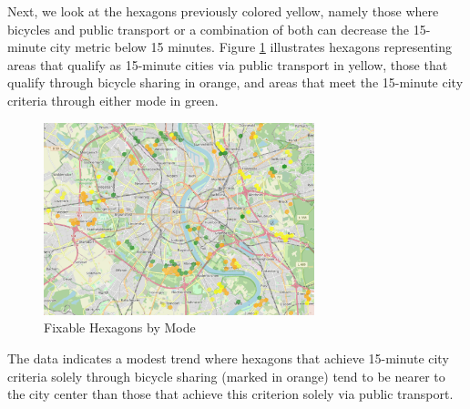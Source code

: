 Next, we look at the hexagons previously colored yellow, namely those where bicycles and public transport or a combination of both can decrease the 15-minute city metric below 15 minutes.
Figure \ref{fig:fixable_hexagons} illustrates hexagons representing areas that qualify as 15-minute cities via public transport in yellow, those that qualify through bicycle sharing in orange, and areas that meet the 15-minute city criteria through either mode in green.
\begin{figure}
  \begin{center}
    \includegraphics[width=0.70\textwidth]{Figures/results/problematic_hexagons/fixable_hexagons}
  \end{center}
  \caption{Fixable Hexagons by Mode}
  \label{fig:fixable_hexagons}
\end{figure}
The data indicates a modest trend where hexagons that achieve 15-minute city criteria solely through bicycle sharing (marked in orange) tend to be nearer to the city center than those that achieve this criterion solely via public transport.

